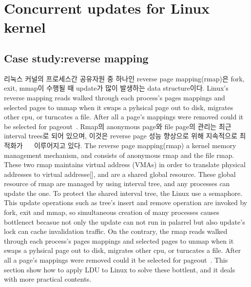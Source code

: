 \section{Concurrent updates for Linux kernel}

\subsection{Case study:reverse mapping}


\ifkor
리눅스 커널의 프로세스간 공유자원 중 하나인 reverse page mapping(rmap)은 fork, exit, mmap이 수행될 때
update가 많이 발생하는 data structure이다.
Linux's reverse mapping reads walked through each process’s pages mappings and
selected pages to unmap when it swaps a pyhsical page out to disk, migrates
other cpu, or turncates a file.
After all a page’s mappings were removed could it be selected for
pageout~\cite{OBJMAPOLS}.
Rmap의 anonymous page와 file page의 관리는 최근 interval trees로 되어 있으며, 이것은 reverse page
성능 향상으로 위해 지속적으로 최적화가 ~\cite{CorbetLWNRMAP}~\cite{CorbetLWNANON} 이루어지고 있다. 
\else
The reverse page mapping(rmap) a kernel memory management mechanism, and
consists of anonymous rmap and the file rmap.
These two rmap maintains virtual address (VMAs) in order to translate physical
addresses to virtual addresse[], and are a shared global resource.
These global resource of rmap are managed by using interval tree, and any
processes can update the one.
To protect the shared interval tree, the Linux use a semaphore.
This update operations such as tree's insert and remove operation are invoked by
fork, exit and mmap, so simultaneous creation of many processes causes
bottlenect becasue not only the update can not run in palarrel but also update's
lock can cache invalidation traffic.
On the contrary, the rmap reads walked through each process’s pages
mappings and selected pages to unmap when it swaps a pyhsical page out to disk, migrates
other cpu, or turncates a file.
After all a page’s mappings were removed could it be selected for
pageout~\cite{OBJMAPOLS}.
This section show how to apply LDU to Linux to solve these bottlent, and it
deals with more practical contents.
\fi

